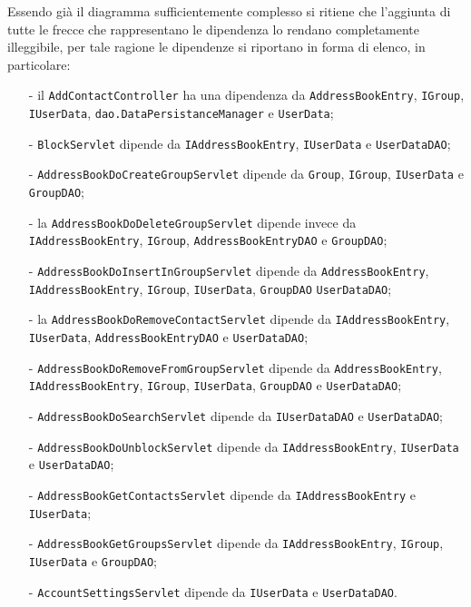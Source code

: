 Essendo già il diagramma sufficientemente complesso si ritiene che l'aggiunta di tutte le frecce che rappresentano le dipendenza lo rendano completamente illeggibile, per tale ragione le dipendenze si riportano in forma di elenco, in particolare:
\begin{itemize}[noitemsep,nolistsep,leftmargin=.5em]
  \item[-] il  \texttt{AddContactController} ha una dipendenza da \texttt{AddressBookEntry}, \texttt{IGroup}, \texttt{IUserData}, \texttt{dao.DataPersistanceManager} e \texttt{UserData};
  \item[-] \texttt{BlockServlet} dipende da \texttt{IAddressBookEntry}, \texttt{IUserData} e \texttt{UserDataDAO};
  \item[-] \texttt{AddressBookDoCreateGroupServlet} dipende da \texttt{Group}, \texttt{IGroup}, \texttt{IUserData} e \texttt{GroupDAO};
  \item[-] la   \texttt{AddressBookDoDeleteGroupServlet} dipende invece da \texttt{IAddressBookEntry}, \texttt{IGroup}, \texttt{AddressBookEntryDAO} e \texttt{GroupDAO};
  \item[-] \texttt{AddressBookDoInsertInGroupServlet} dipende da \texttt{AddressBookEntry}, \texttt{IAddressBookEntry}, \texttt{IGroup}, \texttt{IUserData}, \texttt{GroupDAO} \texttt{UserDataDAO};
  \item[-] la  \texttt{AddressBookDoRemoveContactServlet} dipende da \texttt{IAddressBookEntry}, \texttt{IUserData}, \texttt{AddressBookEntryDAO} e \texttt{UserDataDAO};
  \item[-] \texttt{AddressBookDoRemoveFromGroupServlet} dipende da \texttt{AddressBookEntry}, \texttt{IAddressBookEntry}, \texttt{IGroup}, \texttt{IUserData}, \texttt{GroupDAO} e \texttt{UserDataDAO};
  \item[-] \texttt{AddressBookDoSearchServlet} dipende da \texttt{IUserDataDAO} e \texttt{UserDataDAO};
  \item[-] \texttt{AddressBookDoUnblockServlet} dipende da \texttt{IAddressBookEntry}, \texttt{IUserData} e \texttt{UserDataDAO};
  \item[-] \texttt{AddressBookGetContactsServlet} dipende da \texttt{IAddressBookEntry} e \texttt{IUserData};
  \item[-] \texttt{AddressBookGetGroupsServlet} dipende da \texttt{IAddressBookEntry}, \texttt{IGroup}, \texttt{IUserData} e \texttt{GroupDAO};
  \item[-] \texttt{AccountSettingsServlet} dipende da \texttt{IUserData} e \texttt{UserDataDAO}.
\end{itemize}

